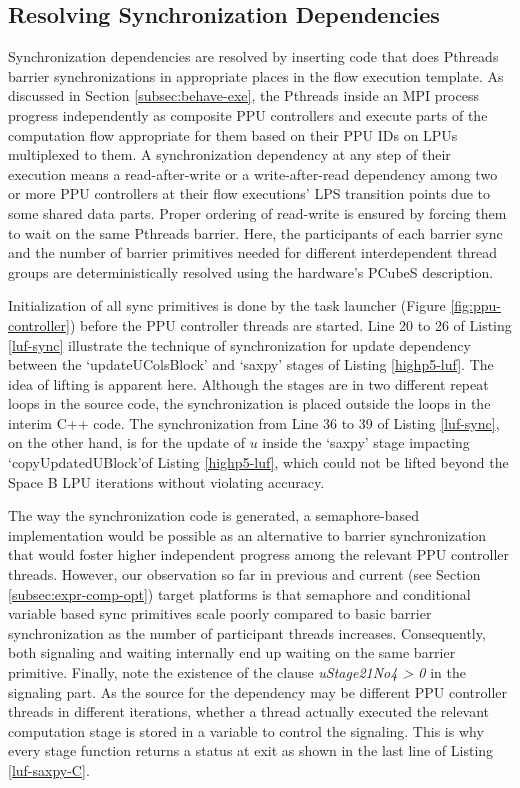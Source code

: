 \documentclass[ASNA,twocolumn]{USG} %
\begin{document}
{\subsection{Resolving Synchronization Dependencies}
\label{subsec:sync-dependencies}
Synchronization dependencies are resolved by inserting code that does Pthreads barrier synchronizations in appropriate places in the flow execution template.  
{\color{red} As discussed in Section \ref{subsec:behave-exe}, the Pthreads inside an MPI process progress independently as composite PPU controllers and execute parts of the computation flow appropriate for them based on their PPU IDs on LPUs multiplexed to them. A synchronization dependency at any step of their execution means a read-after-write or a write-after-read dependency among two or more PPU controllers at their flow executions' LPS transition points due to some shared data parts. Proper ordering of read-write is ensured by forcing them to wait on the same Pthreads barrier. Here, the participants of each barrier sync and the number of barrier primitives needed for different interdependent thread groups are deterministically resolved using the hardware's PCubeS description.}

Initialization of all sync primitives is done by the task launcher (Figure \ref{fig:ppu-controller}) before the PPU controller threads are started. Line 20 to 26 of Listing \ref{luf-sync} illustrate the technique of synchronization for update dependency between the `updateUColsBlock'  and `saxpy' stages of Listing \ref{highp5-luf}. The idea of lifting is apparent here. Although the stages are in two different repeat loops in the source code, the synchronization is placed outside the loops in the interim C++ code. The synchronization from Line 36 to 39 of Listing \ref{luf-sync}, on the other hand, is for the update of $u$ inside the `saxpy' stage impacting `copyUpdatedUBlock'of Listing \ref{highp5-luf}, which could not be lifted beyond the Space B LPU iterations without violating accuracy.


The way the synchronization code is generated, a semaphore-based implementation would be possible as an alternative to barrier synchronization that would foster higher independent progress among the relevant PPU controller threads. However, our observation so far {\color{red} in previous \citep{yanhaona2024highp5} and current (see Section \ref{subsec:expr-comp-opt})} target platforms is that semaphore and conditional variable based sync primitives scale poorly compared to basic barrier synchronization as the number of participant threads increases. Consequently, both signaling and waiting internally end up waiting on the same barrier primitive. Finally, note the existence of the clause \textit{uStage21No4 > 0} in the signaling part. As the source for the dependency may be different PPU controller threads in different iterations, whether a thread actually executed the relevant computation stage is stored in a variable to control the signaling. This is why every stage function returns a status at exit as shown in the last line of Listing \ref{luf-saxpy-C}.  

}
\end{document}
